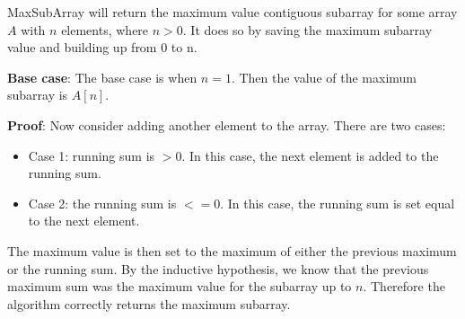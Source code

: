 \documentclass[a4paper,12pt]{article}
\begin{document}
MaxSubArray will return the maximum value contiguous subarray for some array $A$ with $n$ elements, where $n>0$. It does so by saving the maximum subarray value and building up from 0 to n. 

\textbf{Base case}: The base case is when $n=1$. Then the value of the maximum subarray is $A[n]$.

\textbf{Proof}: Now consider adding another element to the array. There are two cases:

\begin{itemize}


\item Case 1: running sum is $> 0$. In this case, the next element is added to the running sum.

\item Case 2: the running sum is $<= 0$. In this case, the running sum is set equal to the next element. 

\end{itemize}

The maximum value is then set to the maximum of either the previous maximum or the running sum. By the inductive hypothesis, we know that the previous maximum sum was the maximum value for the subarray up to $n$. Therefore the algorithm correctly returns the maximum subarray.


\pagebreak
 
\end{document}
